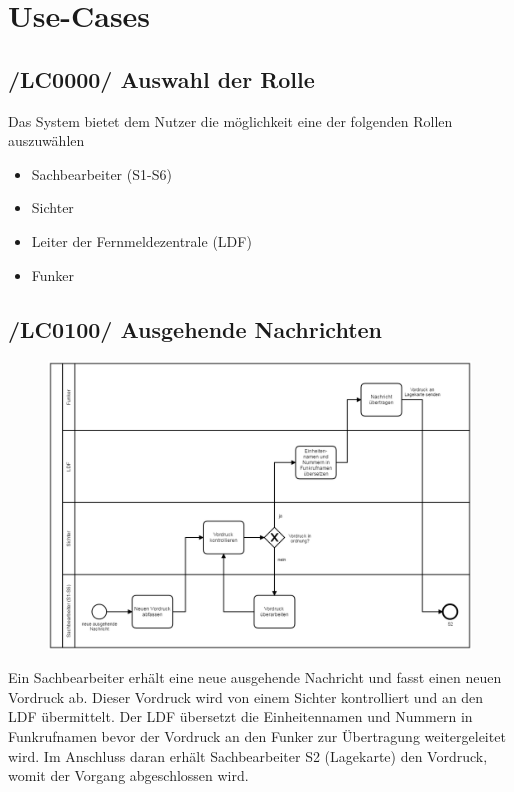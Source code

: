 \section{Use-Cases}

\subsection{/LC0000/ Auswahl der Rolle}
Das System bietet dem Nutzer die möglichkeit eine der folgenden Rollen auszuwählen
\begin{itemize}
\item Sachbearbeiter (S1-S6)
\item Sichter
\item Leiter der Fernmeldezentrale (LDF)
\item Funker
\end{itemize}

\newpage
\subsection{/LC0100/ Ausgehende Nachrichten}
\begin{figure}[htpb]
	\centering
	\includegraphics[width=0.95\linewidth]{ausgehend.png}
\end{figure} Ein Sachbearbeiter erhält eine neue ausgehende Nachricht und fasst einen neuen Vordruck ab. Dieser Vordruck wird von einem Sichter kontrolliert und an den LDF übermittelt. Der LDF übersetzt die Einheitennamen und Nummern in Funkrufnamen bevor der Vordruck an den Funker zur Übertragung weitergeleitet wird. Im Anschluss daran erhält Sachbearbeiter S2 (Lagekarte) den Vordruck, womit der Vorgang abgeschlossen wird.

\newpage

